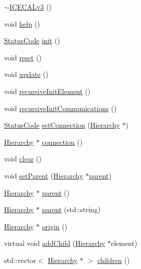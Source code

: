 \begin{DoxyCompactItemize}
\item 
\hyperlink{classICECALv3_acdadf9483fc38a615192de41548024a1}{$\sim$\+I\+C\+E\+C\+A\+Lv3} ()
\item 
void \hyperlink{classICECALv3_a00e572849b4952e7cf04a39f992df037}{help} ()
\item 
\hyperlink{classStatusCode}{Status\+Code} \hyperlink{classICECALv3_abf7281fad80b80b70c5b13ce66ba3451}{init} ()
\item 
void \hyperlink{classICECALv3_a33afc7c8e0f399336152abd03cbe8d1b}{reset} ()
\item 
void \hyperlink{classICECALv3_ab2a00809e9a4f2ab83ef041a886ca637}{update} ()
\item 
void \hyperlink{classElement_a3c0abcb36f8906688bb7e32608df7086}{recursive\+Init\+Element} ()
\item 
void \hyperlink{classElement_a82119ed37dff76508a2746a853ec35ba}{recursive\+Init\+Communications} ()
\item 
\hyperlink{classStatusCode}{Status\+Code} \hyperlink{classElement_ab476b4b1df5954141ceb14f072433b89}{set\+Connection} (\hyperlink{classHierarchy}{Hierarchy} $\ast$)
\item 
\hyperlink{classHierarchy}{Hierarchy} $\ast$ \hyperlink{classElement_af57444353c1ddf9fa0109801e97debf7}{connection} ()
\item 
void \hyperlink{classHierarchy_af4d43b0765b402670eed2d62c73405af}{clear} ()
\item 
void \hyperlink{classHierarchy_a585ad1aeec16077a0e532ab8b4fc557b}{set\+Parent} (\hyperlink{classHierarchy}{Hierarchy} $\ast$\hyperlink{classHierarchy_a1c7bec8257e717f9c1465e06ebf845fc}{parent})
\item 
\hyperlink{classHierarchy}{Hierarchy} $\ast$ \hyperlink{classHierarchy_a1c7bec8257e717f9c1465e06ebf845fc}{parent} ()
\item 
\hyperlink{classHierarchy}{Hierarchy} $\ast$ \hyperlink{classHierarchy_ad550588733bf75ac5c0fcfd7c8fd11a6}{parent} (std\+::string)
\item 
\hyperlink{classHierarchy}{Hierarchy} $\ast$ \hyperlink{classHierarchy_aee461dc930ce3871636ff87f075b1b83}{origin} ()
\item 
virtual void \hyperlink{classHierarchy_ad677774ff38fcb257c04a3a10d471fac}{add\+Child} (\hyperlink{classHierarchy}{Hierarchy} $\ast$element)
\item 
std\+::vector$<$ \hyperlink{classHierarchy}{Hierarchy} $\ast$ $>$ \hyperlink{classHierarchy_aa9a76f69e98e052ee1a6e32cea006288}{children} ()
\item 

\end{DoxyCompactItemize}
